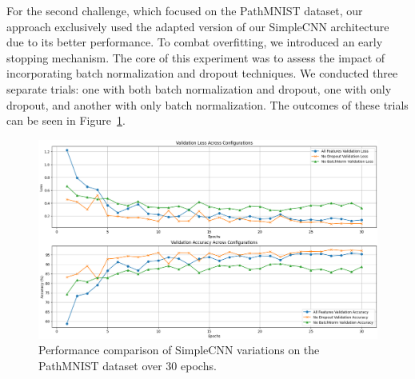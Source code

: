 For the second challenge, which focused on the PathMNIST dataset, our approach exclusively used the adapted version of our SimpleCNN architecture due to its better performance. To combat overfitting, we introduced an early stopping mechanism. The core of this experiment was to assess the impact of incorporating batch normalization and dropout techniques. We conducted three separate trials: one with both batch normalization and dropout, one with only dropout, and another with only batch normalization. The outcomes of these trials can be seen in Figure~\ref{fig:pathMNIST_variations}.

\begin{figure} [ht]
  \centering
  \includegraphics[width=.8\textwidth]{figures/simpleCNN_PathMNIST_variations.png}
  \caption{Performance comparison of SimpleCNN variations on the PathMNIST dataset over 30 epochs.}\label{fig:pathMNIST_variations}
\end{figure}